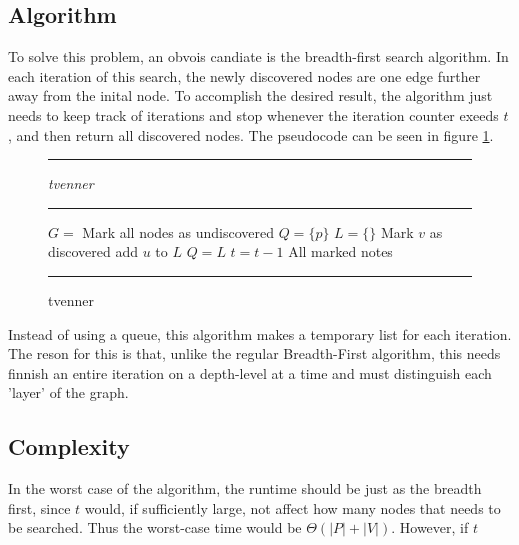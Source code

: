 \subsection{Algorithm}

To solve this problem, an obvois candiate is the
breadth-first search algorithm. In each iteration of this
search, the newly discovered nodes are one edge further 
away from the inital node. To accomplish the desired result, 
the algorithm just needs to keep track of iterations and
stop whenever the iteration counter exeeds $t$, and then
return all discovered nodes. The pseudocode can 
be seen in figure \ref{fig:tvennerpcode}.

\begin{figure}[ht]
\hrule
\vspace{0.2cm}
{\centering  \textit{tvenner}}
\vspace{0.2cm}
\hrule
\begin{algorithmic}
\State $G = $ 
\State Mark all nodes as undiscovered
\State $Q = \{p\}$
\State $L = \{\}$
	\State Mark $v$ as discovered
		\State add $u$ to $L$
	\EndFor
\EndFor
\State $Q = L$
\State $t = t-1$
\EndWhile
\State \Return All marked notes
\EndFunction
\end{algorithmic}
\hrule
\caption{tvenner  \label{fig:tvennerpcode}}
\end{figure}

Instead of using a queue, this algorithm makes a temporary list 
for each iteration. The reson for this is that, unlike the 
regular Breadth-First algorithm, this needs finnish an entire 
iteration on a depth-level at a time and must distinguish 
each 'layer' of the graph.

\subsection{Complexity}

In the worst case of the algorithm, the runtime should be just as
the breadth first, since $t$ would, if sufficiently large, not 
affect how many nodes that needs to be searched. Thus the
worst-case time would be $\Theta \left( |P| + |V| \right)$.
However, if $t$ 








